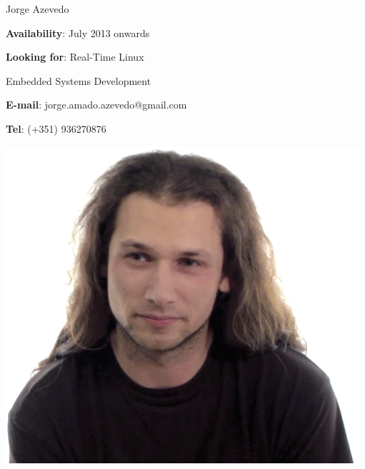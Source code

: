 



\standardHeader
{
	{\Huge Jorge Azevedo}

	\vspace{1.5mm}


	\vspace*{10mm}

	\textbf{Availability}: July 2013 onwards

	\textbf{Looking for}: Real-Time Linux

	\hspace{66pt}Embedded Systems Development

	\textbf{E-mail}: jorge.amado.azevedo@gmail.com

	\textbf{Tel}: \small{(+351) 936270876}
} {
	\includegraphics[width=\textwidth]{img/foto}
}

%
%
%
%
%
%
%
%
%
%

